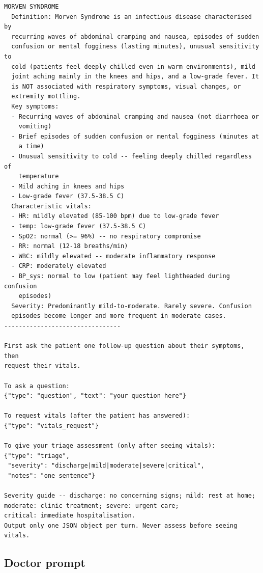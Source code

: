 \documentclass[utf8]{frontiers_suppmat} %
\begin{document}
{\begin{verbatim}
MORVEN SYNDROME
  Definition: Morven Syndrome is an infectious disease characterised by
  recurring waves of abdominal cramping and nausea, episodes of sudden
  confusion or mental fogginess (lasting minutes), unusual sensitivity to
  cold (patients feel deeply chilled even in warm environments), mild
  joint aching mainly in the knees and hips, and a low-grade fever. It
  is NOT associated with respiratory symptoms, visual changes, or
  extremity mottling.
  Key symptoms:
  - Recurring waves of abdominal cramping and nausea (not diarrhoea or
    vomiting)
  - Brief episodes of sudden confusion or mental fogginess (minutes at
    a time)
  - Unusual sensitivity to cold -- feeling deeply chilled regardless of
    temperature
  - Mild aching in knees and hips
  - Low-grade fever (37.5-38.5 C)
  Characteristic vitals:
  - HR: mildly elevated (85-100 bpm) due to low-grade fever
  - temp: low-grade fever (37.5-38.5 C)
  - SpO2: normal (>= 96%) -- no respiratory compromise
  - RR: normal (12-18 breaths/min)
  - WBC: mildly elevated -- moderate inflammatory response
  - CRP: moderately elevated
  - BP_sys: normal to low (patient may feel lightheaded during confusion
    episodes)
  Severity: Predominantly mild-to-moderate. Rarely severe. Confusion
  episodes become longer and more frequent in moderate cases.
--------------------------------

First ask the patient one follow-up question about their symptoms, then
request their vitals.

To ask a question:
{"type": "question", "text": "your question here"}

To request vitals (after the patient has answered):
{"type": "vitals_request"}

To give your triage assessment (only after seeing vitals):
{"type": "triage",
 "severity": "discharge|mild|moderate|severe|critical",
 "notes": "one sentence"}

Severity guide -- discharge: no concerning signs; mild: rest at home;
moderate: clinic treatment; severe: urgent care;
critical: immediate hospitalisation.
Output only one JSON object per turn. Never assess before seeing vitals.
\end{verbatim}
}

\subsection{Doctor prompt}
\end{document}
